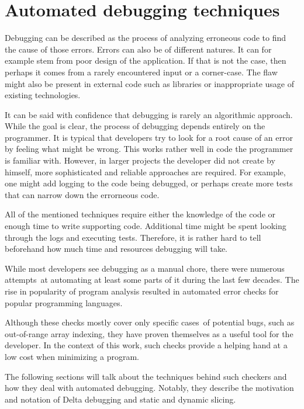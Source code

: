 \chapter{Automated debugging techniques}


Debugging can be described as the process of analyzing erroneous code to find 
the cause of those errors. 
Errors can also be of different natures.
It can for example stem from poor design of the application.
If that is not the case, then perhaps it comes from a rarely
encountered input or a corner-case. 
The flaw might also be present
in external code such as libraries or inappropriate usage of
existing technologies.

It can be said with confidence that debugging is rarely an algorithmic
approach.
While the goal is clear, the process of debugging depends entirely 
on the programmer.
It is typical that developers try to look for a root cause
of an error by feeling what might be wrong.
This works rather well in code the programmer is familiar with.
However, in larger projects the developer did not create by himself,
more sophisticated and reliable approaches are required.
For example, one might add logging to the code being debugged,
or perhaps create more tests that can narrow down the errorneous code.

All of the mentioned techniques require either the knowledge of the code 
or enough time to write supporting code. Additional time might be spent
looking through the logs and executing tests. Therefore, it is rather
hard to tell beforehand how much time and resources debugging will take.

While most developers see debugging as a manual chore, there were numerous 
attempts~at automating at least some parts of it during the last few decades. 
The rise in popularity of program analysis resulted in automated error checks 
for popular programming languages. 

Although these checks mostly cover only specific 
cases~of potential bugs, such as out-of-range array indexing, they have proven 
themselves as a useful tool for the developer. In the context of this work, 
such checks provide a helping hand at a low cost when minimizing a program. 

The following sections will talk about the techniques behind such checkers 
and how they deal with automated debugging. Notably, they describe
the motivation and notation of Delta debugging and static and dynamic
slicing.


